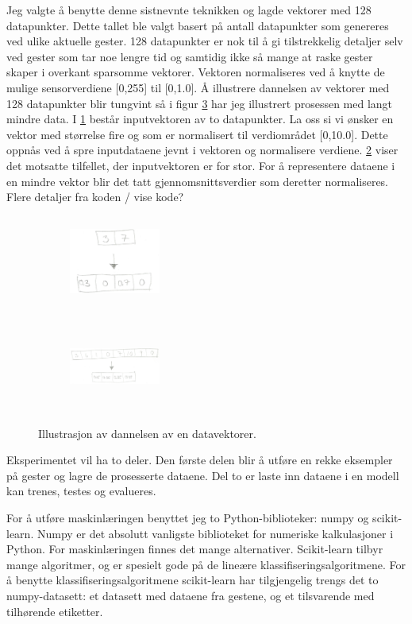 Jeg valgte å benytte denne sistnevnte teknikken og lagde vektorer med 128 datapunkter. Dette tallet ble valgt basert på antall datapunkter som genereres ved ulike aktuelle gester. 128 datapunkter er nok til å gi tilstrekkelig detaljer selv ved gester som tar noe lengre tid og samtidig ikke så mange at raske gester skaper i overkant sparsomme vektorer. Vektoren normaliseres ved å knytte de mulige sensorverdiene [0,255] til [0,1.0]. Å illustrere dannelsen av vektorer med 128 datapunkter blir tungvint så i figur \ref{fig:data} har jeg illustrert prosessen med langt mindre data. I \ref{fig:few} består inputvektoren av to datapunkter. La oss si vi ønsker en vektor med størrelse fire og som er normalisert til verdiområdet [0,10.0]. Dette oppnås ved å spre inputdataene jevnt i vektoren og normalisere verdiene. \ref{fig:many} viser det motsatte tilfellet, der inputvektoren er for stor. For å representere dataene i en mindre vektor blir det tatt gjennomsnittsverdier som deretter normaliseres. {\color{red}Flere detaljer fra koden / vise kode?}
\begin{figure}[h]
\centering
\begin{subfigure}{0.23\textwidth}
\includegraphics[width=3cm, height=3cm]{fig/few-to-many}
\caption{}
\label{fig:few}
\end{subfigure}
\begin{subfigure}{0.23\textwidth}
\includegraphics[width=3cm, height=3cm]{fig/many-to-few}
\caption{}
\label{fig:many}
\end{subfigure}
\caption{Illustrasjon av dannelsen av en datavektorer.}
\label{fig:data}
\end{figure}
Eksperimentet vil ha to deler. Den første delen blir å utføre en rekke eksempler på gester og lagre de prosesserte dataene. Del to er laste inn dataene i en modell kan trenes, testes og evalueres.  

For å utføre maskinlæringen benyttet jeg to Python-biblioteker: numpy og scikit-learn. Numpy er det absolutt vanligste biblioteket for numeriske kalkulasjoner i Python. For maskinlæringen finnes det mange alternativer. Scikit-learn tilbyr mange algoritmer, og er spesielt gode på de lineære klassifiseringsalgoritmene. For å benytte klassifiseringsalgoritmene scikit-learn har tilgjengelig trengs det to numpy-datasett: et datasett med dataene fra gestene, og et tilsvarende med tilhørende etiketter.

